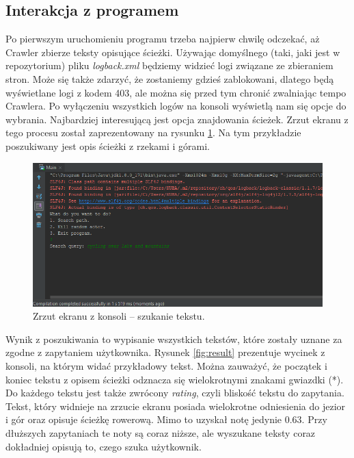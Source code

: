 \documentclass[titlepage]{article}
\begin{document}
\subsection{Interakcja z programem}
Po pierwszym uruchomieniu programu trzeba najpierw chwilę odczekać, aż Crawler zbierze teksty opisujące ścieżki. Używając domyślnego (taki, jaki jest w repozytorium) pliku \textit{logback.xml} będziemy widzieć logi związane ze zbieraniem stron. Może się także zdarzyć, że zostaniemy gdzieś zablokowani, dlatego będą wyświetlane logi z kodem 403, ale można się przed tym chronić zwalniając tempo Crawlera. Po wyłączeniu wszystkich logów na konsoli wyświetlą nam się opcje do wybrania. Najbardziej interesującą jest opcja znajdowania ścieżek. Zrzut ekranu z tego procesu został zaprezentowany na rysunku \ref{fig:search}. Na tym przykładzie poszukiwany jest opis ścieżki z rzekami i górami.
\FloatBarrier

\begin{figure}[h!]
\centering
\includegraphics[width=\textwidth]{SS-search.png}
\caption{Zrzut ekranu z konsoli -- szukanie tekstu.}
\label{fig:search}
\end{figure}

Wynik z poszukiwania to wypisanie wszystkich tekstów, które zostały uznane za zgodne z zapytaniem użytkownika. Rysunek \ref{fig:result} prezentuje wycinek z konsoli, na którym widać przykładowy tekst. Można zauważyć, że początek i koniec tekstu z opisem ścieżki odznacza się wielokrotnymi znakami gwiazdki (*). Do każdego tekstu jest także zwrócony \textit{rating}, czyli bliskość tekstu do zapytania. Tekst, który widnieje na zrzucie ekranu posiada wielokrotne odniesienia do jezior i gór oraz opisuje ścieżkę rowerową. Mimo to uzyskał notę jedynie 0.63. Przy dłuższych zapytaniach te noty są coraz niższe, ale wyszukane teksty coraz dokładniej opisują to, czego szuka użytkownik.

\FloatBarrier
\end{document}
